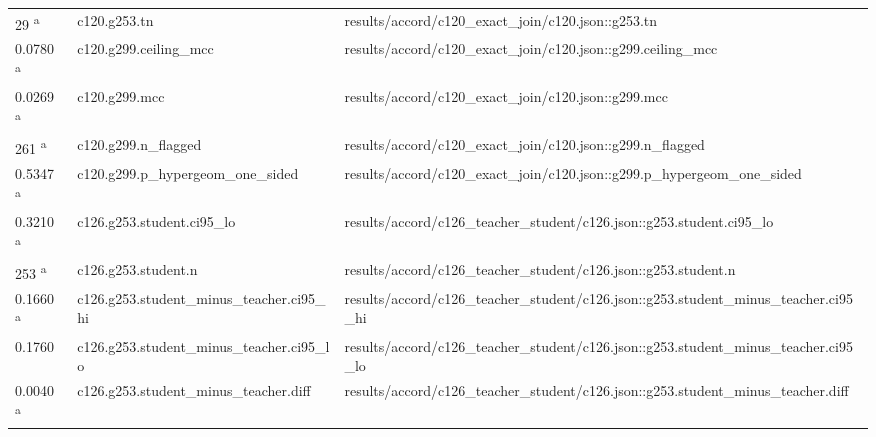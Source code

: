 \begin{longtable}{@{}p{0.7in}p{1.9in}p{2.6in}@{}}
29 \textsuperscript{a} & c120.\allowbreak{}g253.\allowbreak{}tn & results/\allowbreak{}accord/\allowbreak{}c120\_exact\_join/\allowbreak{}c120.\allowbreak{}json::g253.\allowbreak{}tn\\
0.0780 \textsuperscript{a} & c120.\allowbreak{}g299.\allowbreak{}ceiling\_mcc & results/\allowbreak{}accord/\allowbreak{}c120\_exact\_join/\allowbreak{}c120.\allowbreak{}json::g299.\allowbreak{}ceiling\_mcc\\
0.0269 \textsuperscript{a} & c120.\allowbreak{}g299.\allowbreak{}mcc & results/\allowbreak{}accord/\allowbreak{}c120\_exact\_join/\allowbreak{}c120.\allowbreak{}json::g299.\allowbreak{}mcc\\
261 \textsuperscript{a} & c120.\allowbreak{}g299.\allowbreak{}n\_flagged & results/\allowbreak{}accord/\allowbreak{}c120\_exact\_join/\allowbreak{}c120.\allowbreak{}json::g299.\allowbreak{}n\_flagged\\
0.5347 \textsuperscript{a} & c120.\allowbreak{}g299.\allowbreak{}p\_hypergeom\_one\_sided & results/\allowbreak{}accord/\allowbreak{}c120\_exact\_join/\allowbreak{}c120.\allowbreak{}json::g299.\allowbreak{}p\_hypergeom\_one\_sided\\
0.3210 \textsuperscript{a} & c126.\allowbreak{}g253.\allowbreak{}student.\allowbreak{}ci95\_lo & results/\allowbreak{}accord/\allowbreak{}c126\_teacher\_student/\allowbreak{}c126.\allowbreak{}json::g253.\allowbreak{}student.\allowbreak{}ci95\_lo\\
253 \textsuperscript{a} & c126.\allowbreak{}g253.\allowbreak{}student.\allowbreak{}n & results/\allowbreak{}accord/\allowbreak{}c126\_teacher\_student/\allowbreak{}c126.\allowbreak{}json::g253.\allowbreak{}student.\allowbreak{}n\\
0.1660 \textsuperscript{a} & c126.\allowbreak{}g253.\allowbreak{}student\_minus\_teacher.\allowbreak{}ci95\_hi & results/\allowbreak{}accord/\allowbreak{}c126\_teacher\_student/\allowbreak{}c126.\allowbreak{}json::g253.\allowbreak{}student\_minus\_teacher.\allowbreak{}ci95\_hi\\
0.1760 & c126.\allowbreak{}g253.\allowbreak{}student\_minus\_teacher.\allowbreak{}ci95\_lo & results/\allowbreak{}accord/\allowbreak{}c126\_teacher\_student/\allowbreak{}c126.\allowbreak{}json::g253.\allowbreak{}student\_minus\_teacher.\allowbreak{}ci95\_lo\\
0.0040 \textsuperscript{a} & c126.\allowbreak{}g253.\allowbreak{}student\_minus\_teacher.\allowbreak{}diff & results/\allowbreak{}accord/\allowbreak{}c126\_teacher\_student/\allowbreak{}c126.\allowbreak{}json::g253.\allowbreak{}student\_minus\_teacher.\allowbreak{}diff\\

\end{longtable}
